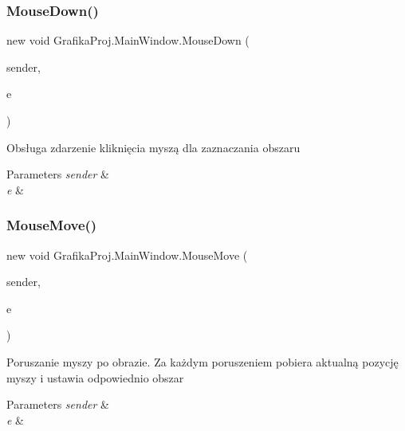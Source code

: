 \subsubsection{\texorpdfstring{MouseDown()}{MouseDown()}}
{\footnotesize\ttfamily new void Grafika\+Proj.\+Main\+Window.\+Mouse\+Down (\begin{DoxyParamCaption}\item[{object}]{sender,  }\item[{Mouse\+Event\+Args}]{e }\end{DoxyParamCaption})\hspace{0.3cm}{\ttfamily [private]}}



Obsługa zdarzenie kliknięcia myszą dla zaznaczania obszaru 


\begin{DoxyParams}{Parameters}
{\em sender} & \\
\hline
{\em e} & \\
\hline
\end{DoxyParams}
\mbox{\label{class_grafika_proj_1_1_main_window_a5b445a8533469df91eb5d3cc963a447d}} 
\subsubsection{\texorpdfstring{MouseMove()}{MouseMove()}}
{\footnotesize\ttfamily new void Grafika\+Proj.\+Main\+Window.\+Mouse\+Move (\begin{DoxyParamCaption}\item[{object}]{sender,  }\item[{Mouse\+Event\+Args}]{e }\end{DoxyParamCaption})\hspace{0.3cm}{\ttfamily [private]}}



Poruszanie myszy po obrazie. Za każdym poruszeniem pobiera aktualną pozycję myszy i ustawia odpowiednio obszar 


\begin{DoxyParams}{Parameters}
{\em sender} & \\
\hline
{\em e} & \\
\hline
\end{DoxyParams}
\mbox{\label{class_grafika_proj_1_1_main_window_a6cab0f4d9982cfdf44b131ccb21d7138}} 
